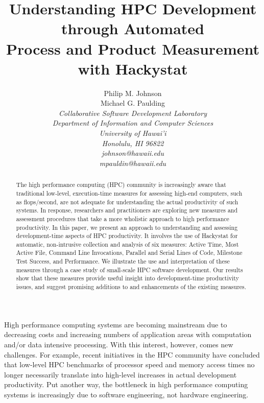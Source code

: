 \documentclass[10pt,twocolumn]{article}
\begin{document}
\title{Understanding HPC Development through Automated \\Process and Product Measurement with Hackystat}


\author{Philip M. Johnson \\ Michael G. Paulding \\
\em  Collaborative Software Development Laboratory \\
\em  Department of Information and Computer Sciences \\
\em  University of Hawai'i \\
\em  Honolulu, HI 96822 \\
\em  johnson@hawaii.edu\\
\em mpauldin@hawaii.edu}
\maketitle
\thispagestyle{empty}

\begin{abstract}
The high performance computing (HPC) community is increasingly
aware that traditional low-level, execution-time measures for assessing
high-end computers, such as flops/second, are not adequate for
understanding the actual productivity of such systems. In response,
researchers and practitioners are exploring new measures and assessment
procedures that take a more wholistic approach to high performance
productivity. In this paper, we present an approach to understanding and
assessing development-time aspects of HPC productivity. It involves the use 
of Hackystat for automatic, non-intrusive collection and analysis of six
measures: Active Time, Most Active File,
Command Line Invocations, Parallel and Serial Lines of Code, Milestone
Test Success, and Performance. We illustrate the use and interpretation of 
these measures through a case study of small-scale HPC software development. 
Our results show that these measures provide useful insight into development-time 
productivity issues, and suggest promising additions to and enhancements of the
existing measures. 
\end{abstract}

\label{sec:intro}

High performance computing systems are becoming mainstream due to
decreasing costs and increasing numbers of application areas with
computation and/or data intensive processing.  With this interest, however,
comes new challenges. For example, recent initiatives in the HPC community
\cite{Reed03,DarpaHPCS} have concluded that low-level HPC benchmarks of
processor speed and memory access times no longer necessarily translate
into high-level increases in actual development productivity.  Put another
way, the bottleneck in high performance computing systems is increasingly
due to software engineering, not hardware engineering.
\end{document}
